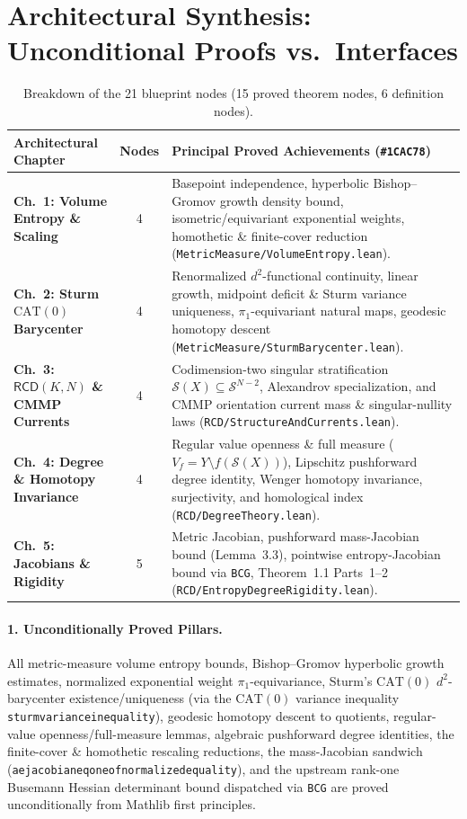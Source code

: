 \documentclass[10pt]{article}
\renewcommand{\_}{\origus\allowbreak}
\newcommand{\code}[1]{\texttt{#1}}
\newcommand{\NTotalNodes}{21}
\newcommand{\NProvedNodes}{15}
\newcommand{\NDefNodes}{6}
\begin{document}
\section{Architectural Synthesis: Unconditional Proofs vs.\ Interfaces}

\begin{table}[!ht]
\centering\footnotesize
\renewcommand{\arraystretch}{1.12}
\begin{tabularx}{\textwidth}{@{}>{\bfseries}l c X@{}}
\toprule
Architectural Chapter & Nodes & Principal Proved Achievements (\code{\#1CAC78}) \\
\midrule
Ch.\ 1: Volume Entropy \& Scaling & 4 & Basepoint independence, hyperbolic Bishop--Gromov growth density bound, isometric/equivariant exponential weights, homothetic \& finite-cover reduction (\code{MetricMeasure/VolumeEntropy.lean}). \\
Ch.\ 2: Sturm $\mathrm{CAT}(0)$ Barycenter & 4 & Renormalized $d^2$-functional continuity, linear growth, midpoint deficit \& Sturm variance uniqueness, $\pi_1$-equivariant natural maps, geodesic homotopy descent (\code{MetricMeasure/SturmBarycenter.lean}). \\
Ch.\ 3: $\mathsf{RCD}(K,N)$ \& CMMP Currents & 4 & Codimension-two singular stratification $\mathcal{S}(X)\subseteq\mathcal{S}^{N-2}$, Alexandrov specialization, and CMMP orientation current mass \& singular-nullity laws (\code{RCD/StructureAndCurrents.lean}). \\
Ch.\ 4: Degree \& Homotopy Invariance & 4 & Regular value openness \& full measure ($V_f = Y \setminus f(\mathcal{S}(X))$), Lipschitz pushforward degree identity, Wenger homotopy invariance, surjectivity, and homological index (\code{RCD/DegreeTheory.lean}). \\
Ch.\ 5: Jacobians \& Rigidity & 5 & Metric Jacobian, pushforward mass-Jacobian bound (Lemma~3.3), pointwise entropy-Jacobian bound via \code{BCG}, Theorem~1.1 Parts~1--2 (\code{RCD/EntropyDegreeRigidity.lean}). \\
\bottomrule
\end{tabularx}
\caption{Breakdown of the \NTotalNodes{} blueprint nodes (\NProvedNodes{} proved theorem nodes, \NDefNodes{} definition nodes).}
\label{tab:layers}
\end{table}

\paragraph{1. Unconditionally Proved Pillars.}
All metric-measure volume entropy bounds, Bishop--Gromov hyperbolic growth estimates, normalized
exponential weight $\pi_1$-equivariance, Sturm's $\mathrm{CAT}(0)$ $d^2$-barycenter existence/uniqueness
(via the $\mathrm{CAT}(0)$ variance inequality \code{sturm\_variance\_inequality}), geodesic homotopy
descent to quotients, regular-value openness/full-measure lemmas, algebraic pushforward degree identities,
the finite-cover \& homothetic rescaling reductions, the mass-Jacobian sandwich
(\code{ae\_jacobian\_eq\_one\_of\_normalized\_equality}), and the upstream rank-one Busemann Hessian
determinant bound dispatched via \code{BCG} are proved unconditionally from Mathlib first principles.
\end{document}
